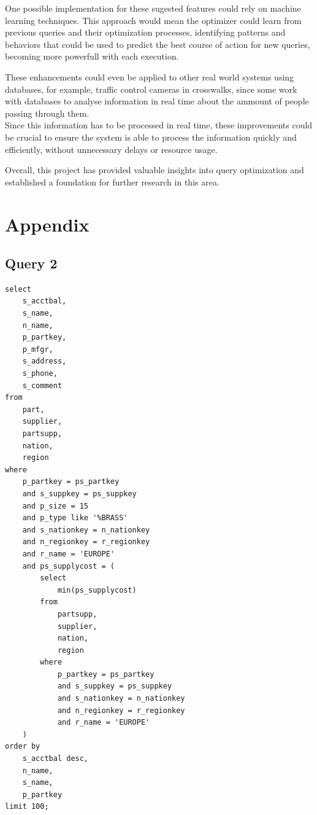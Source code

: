 \documentclass[a4paper,12pt]{scrreprt}
\begin{document}
One possible implementation for these sugested features could rely on machine learning techniques. This approach would mean the optimizer could learn from previous queries and their optimization processes, identifying patterns and behaviors that could be used to predict the best course of action for new queries, becoming more powerfull with each execution.

These enhancements could even be applied to other real world systems using databases, for example, traffic control cameras in crosswalks, since some work with databases to analyse information in real time about the ammount of people passing through them. \\
Since this information has to be processed in real time, these improvements could be crucial to ensure the system is able to process the information quickly and efficiently, without unnecessary delays or resource usage.

Overall, this project has provided valuable insights into query optimization and established a foundation for further research in this area.

\appendix

\chapter{Appendix}
\thispagestyle{fancy}

\section{Query 2}\label{subsec:query2}

\begin{lstlisting}
select
    s_acctbal,
    s_name,
    n_name,
    p_partkey,
    p_mfgr,
    s_address,
    s_phone,
    s_comment
from
    part,
    supplier,
    partsupp,
    nation,
    region
where
    p_partkey = ps_partkey
    and s_suppkey = ps_suppkey
    and p_size = 15
    and p_type like '%BRASS'
    and s_nationkey = n_nationkey
    and n_regionkey = r_regionkey
    and r_name = 'EUROPE'
    and ps_supplycost = (
        select
            min(ps_supplycost)
        from
            partsupp,
            supplier,
            nation,
            region
        where
            p_partkey = ps_partkey
            and s_suppkey = ps_suppkey
            and s_nationkey = n_nationkey
            and n_regionkey = r_regionkey
            and r_name = 'EUROPE'
    )
order by
    s_acctbal desc,
    n_name,
    s_name,
    p_partkey
limit 100;
\end{lstlisting}
\end{document}

